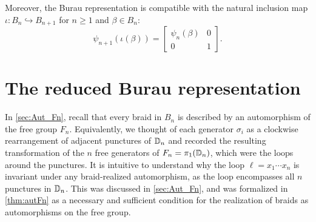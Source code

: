 Moreover, the Burau representation is compatible with the natural inclusion map $\iota:B_n\hookrightarrow B_{n+1}$ for $n\geq 1$ and $\beta\in B_n$:
\begin{equation}
    \psi_{n+1}(\iota(\beta)) = \begin{bmatrix}
        \psi_n(\beta) & 0 \\
        0 & 1
    \end{bmatrix}.
\end{equation}

\section{The reduced Burau representation}
In \cref{sec:Aut_Fn}, recall that every braid in $B_n$ is described by an automorphism of the free group $F_n$. Equivalently, we thought of each generator $\sigma_i$ as a clockwise rearrangement of adjacent punctures of $\mathbb{D}_n$ and recorded the resulting transformation of the $n$ free generators of $F_n = \pi_1(\mathbb{D}_n)$, which were the loops around the punctures. It is intuitive to understand why the loop $\ell=x_1\cdots x_n$ is invariant under any braid-realized automorphism, as the loop  encompasses all $n$ punctures in $\mathbb{D}_n$. This was discussed in \cref{sec:Aut_Fn}, and was formalized in \cref{thm:autFn} as a necessary and sufficient condition for the realization of braids as automorphisms on the free group.



